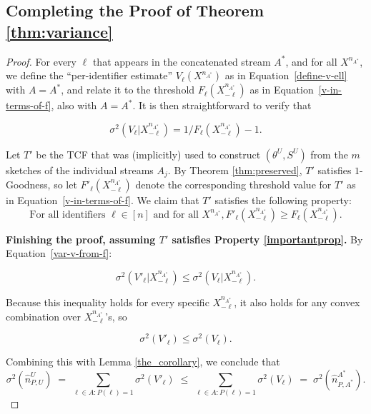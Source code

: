 \documentclass{article}
\newcommand{\xnstar}{X^{n_{A^*}}}
\newcommand{\xnmlstar}{X^{n_{A^*}}_{-\ell}}
\begin{document}
\subsection{Completing the Proof of Theorem \ref{thm:variance}}
\label{sec:twoimpliesvariance}
\label{sec:finalvariance} 
\begin{proof}
For every $\ell$ that appears in the concatenated stream $A^*$, and for all $\xnstar$,
we define the ``per-identifier estimate'' $V_\ell(\xnstar)$ as in Equation~\eqref{define-v-ell} with $A=A^*$, and relate it to the threshold
$F_{\ell}(\xnmlstar)$ as in Equation~\eqref{v-in-terms-of-f}, also with $A=A^*$. It is then straightforward to verify that

\begin{equation}\label{var-v-from-f}
\sigma^2(V_\ell | \xnmlstar) = 1 / F_\ell(\xnmlstar) - 1.
\end{equation}

\noindent Let $T'$ be the TCF that was (implicitly) used to construct $(\theta^U,S^U)$ from the $m$ sketches of the individual streams $A_j$.
By Theorem \ref{thm:preserved}, $T'$ satisfies $1$-Goodness, so let $F'_{\ell}(\xnmlstar)$ denote the corresponding threshold value for $T'$ as in Equation~\eqref{v-in-terms-of-f}. 
We claim that $T'$ satisfies the following property:
\begin{equation}\label{importantprop} \text{For all identifiers } \ell \in [n] \text{ and for all } \xnstar, F'_\ell(\xnmlstar) \ge F_\ell(\xnmlstar). \end{equation} 

\noindent \textbf{Finishing the proof, assuming $T'$ satisfies Property \ref{importantprop}.}
By Equation~\eqref{var-v-from-f}:

\begin{equation}
\sigma^2(V'_\ell | \xnmlstar) \le \sigma^2(V_\ell | \xnmlstar).
\end{equation}

\noindent Because this inequality holds for every specific $\xnmlstar$, it also holds for any convex combination over 
$\xnmlstar$'s, so 

$$\sigma^2(V'_\ell) \le \sigma^2(V_\ell).$$

Combining this with Lemma \ref{the_corollary},
we conclude that 
$$\sigma^2(\hat{n}^U_{P,U}) \;=\; \sum_{\ell \in A : P(\ell) = 1} \sigma^2(V'_\ell) \;\le\;
\sum_{\ell \in A : P(\ell) = 1} \sigma^2(V_\ell) \;=\; \sigma^2(\hat{n}^{A^*}_{P,A^*}).$$


\end{proof}
\end{document}
